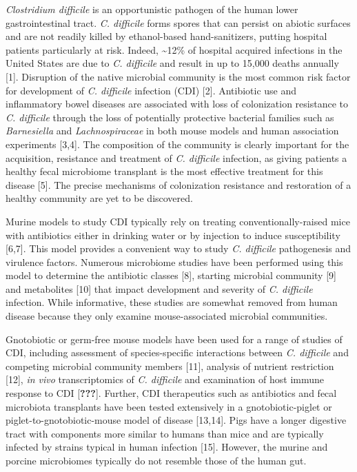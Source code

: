 \documentclass[11pt,]{article}
\begin{document}
\emph{Clostridium difficile} is an opportunistic pathogen of the human
lower gastrointestinal tract. \emph{C. difficile} forms spores that can
persist on abiotic surfaces and are not readily killed by ethanol-based
hand-sanitizers, putting hospital patients particularly at risk. Indeed,
\textasciitilde{}12\% of hospital acquired infections in the United
States are due to \emph{C. difficile} and result in up to 15,000 deaths
annually {[}1{]}. Disruption of the native microbial community is the
most common risk factor for development of \emph{C. difficile} infection
(CDI) {[}2{]}. Antibiotic use and inflammatory bowel diseases are
associated with loss of colonization resistance to \emph{C. difficile}
through the loss of potentially protective bacterial families such as
\emph{Barnesiella} and \emph{Lachnospiraceae} in both mouse models and
human association experiments {[}3,4{]}. The composition of the
community is clearly important for the acquisition, resistance and
treatment of \emph{C. difficile} infection, as giving patients a healthy
fecal microbiome transplant is the most effective treatment for this
disease {[}5{]}. The precise mechanisms of colonization resistance and
restoration of a healthy community are yet to be discovered.

Murine models to study CDI typically rely on treating
conventionally-raised mice with antibiotics either in drinking water or
by injection to induce susceptibility {[}6,7{]}. This model provides a
convenient way to study \emph{C. difficile} pathogenesis and virulence
factors. Numerous microbiome studies have been performed using this
model to determine the antibiotic classes {[}8{]}, starting microbial
community {[}9{]} and metabolites {[}10{]} that impact development and
severity of \emph{C. difficile} infection. While informative, these
studies are somewhat removed from human disease because they only
examine mouse-associated microbial communities.

Gnotobiotic or germ-free mouse models have been used for a range of
studies of CDI, including assessment of species-specific interactions
between \emph{C. difficile} and competing microbial community members
{[}11{]}, analysis of nutrient restriction {[}12{]}, \emph{in vivo}
transcriptomics of \emph{C. difficile} and examination of host immune
response to CDI {[}\textbf{???}{]}. Further, CDI therapeutics such as
antibiotics and fecal microbiota transplants have been tested
extensively in a gnotobiotic-piglet or piglet-to-gnotobiotic-mouse model
of disease {[}13,14{]}. Pigs have a longer digestive tract with
components more similar to humans than mice and are typically infected
by strains typical in human infection {[}15{]}. However, the murine and
porcine microbiomes typically do not resemble those of the human gut.
\end{document}
